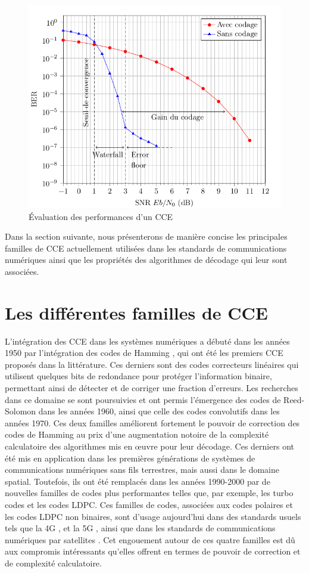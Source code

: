 \documentclass[../main.tex]{subfiles}
\begin{document}
% 
\begin{figure}[]
    \centering
    \includegraphics[scale=0.5]{chapter2/figs/comp_courbes_text.png}
    \caption{Évaluation des performances d'un CCE}
    \label{comp_codes}
\end{figure}

Dans la section suivante, nous présenterons de manière concise les principales familles de CCE actuellement utilisées dans les standards de communications numériques ainsi que les propriétés des algorithmes de décodage qui leur sont associées.
%
%
%
%
\section{Les différentes familles de CCE}
%
%
%
%
L’intégration des CCE dans les systèmes numériques a débuté dans les années 1950 par l’intégration des codes de Hamming \cite{Ham50}, qui ont été les premiers CCE proposés dans la littérature. Ces derniers sont des codes correcteurs linéaires qui utilisent quelques bits de redondance pour protéger l’information binaire, permettant ainsi de détecter et de corriger une fraction d'erreurs. Les recherches dans ce domaine se sont poursuivies et ont permis l'émergence des codes de Reed-Solomon dans les années 1960, ainsi que celle des codes convolutifs dans les années 1970. Ces deux familles améliorent fortement le pouvoir de correction des codes de Hamming au prix d’une augmentation notoire de la complexité calculatoire des algorithmes mis en œuvre pour leur décodage. Ces derniers ont été mis en application dans les premières générations de systèmes de communications numériques sans fils terrestres, mais aussi dans le domaine spatial. Toutefois, ils ont été remplacés dans les années 1990-2000 par de nouvelles familles de codes plus performantes telles que, par exemple, les turbo codes et les codes LDPC. Ces familles de codes, associées aux codes polaires et les codes LDPC non binaires, sont d'usage aujourd'hui dans des standards usuels tels que la 4G \cite{4G}, et la 5G \cite{5g}, ainsi que dans les standards de communications numériques par satellites \cite{DVB:RCS,CCSDS:NB,CCSDS,DVB:S2x}. Cet engouement autour de ces quatre familles est dû aux compromis intéressants qu’elles offrent en termes de pouvoir de correction et de complexité calculatoire.
%
%
%
%
\end{document}
